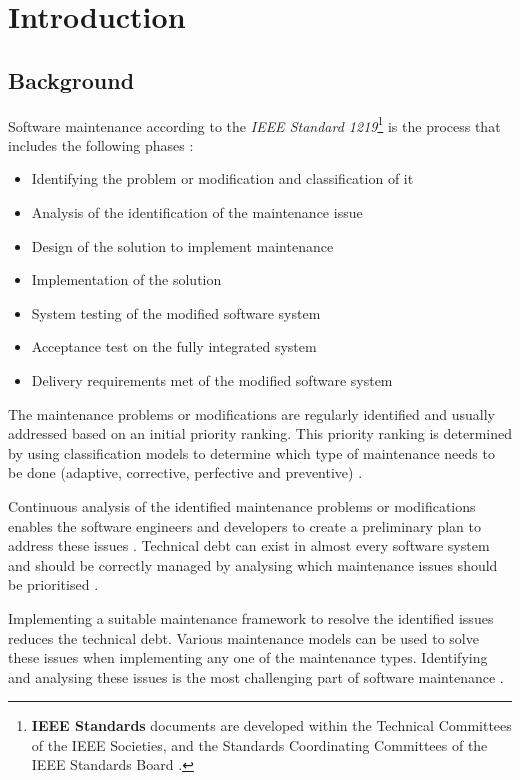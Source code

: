 \chapter{Introduction}
\label{chap:1}

\section{Background}\label{section:ch1_background}

Software maintenance according to the \textit{IEEE Standard 1219}\footnote{\textbf{IEEE Standards} documents are developed within the Technical Committees of the IEEE Societies, and the Standards Coordinating Committees of the IEEE Standards Board \cite{Mamone1994}.} is the process that includes the following phases \cite{Mamone1994, Hasan2012}:
\begin{itemize}
	\item Identifying the problem or modification and classification of it
	\item Analysis of the identification of the maintenance issue
	\item Design of the solution to implement maintenance
	\item Implementation of the solution
	\item System testing of the modified software system
	\item Acceptance test on the fully integrated system
	\item Delivery requirements met of the modified software system
\end{itemize}

The maintenance problems or modifications are regularly identified and usually addressed based on an initial priority ranking. This priority ranking is determined by using classification models to determine which type of maintenance needs to be done (adaptive, corrective, perfective and preventive) \cite{Tang2010, Mamone1994, Ping2010}.\par Continuous analysis of the identified maintenance problems or modifications enables the software engineers and developers to create a preliminary plan to address these issues \cite{Port2017}. Technical debt can exist in almost every software system and should be correctly managed by analysing which maintenance issues should be prioritised \cite{DeLeon-Sigg2020, Reimanis2016}.\par Implementing a suitable maintenance framework to resolve the identified issues reduces the technical debt. Various maintenance models can be used to solve these issues when implementing any one of the maintenance types. Identifying and analysing these issues is the most challenging part of software maintenance \cite{DeLeon-Sigg2020}.

